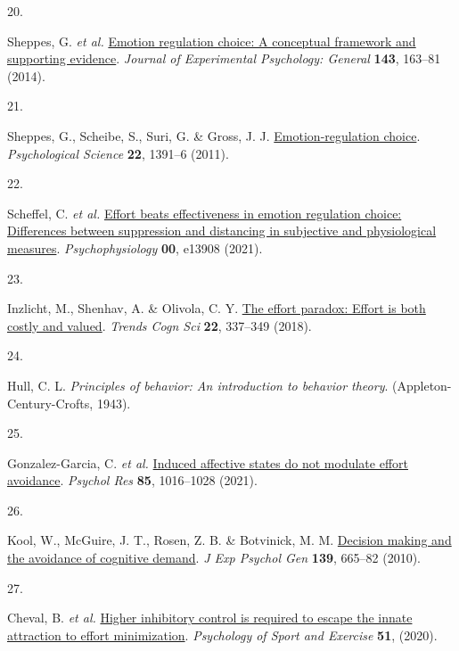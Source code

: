 \documentclass[
  man,floatsintext]{apa6}
\newlength{\cslhangindent}
\newlength{\csllabelwidth}
\newlength{\cslentryspacingunit} %
\newenvironment{CSLReferences}[2] %
 {%
  \setlength{\parindent}{0pt}
  \ifodd #1
  \let\oldpar\par
  \def\par{\hangindent=\cslhangindent\oldpar}
  \fi
  \setlength{\parskip}{#2\cslentryspacingunit}
 }%
 {}
\newcommand{\CSLLeftMargin}[1]{\parbox[t]{\csllabelwidth}{#1}}
\newcommand{\CSLRightInline}[1]{\parbox[t]{\linewidth - \csllabelwidth}{#1}\break}
\begin{document}
\begin{CSLReferences}{0}{0}
\leavevmode{}%
\CSLLeftMargin{20. }%
\CSLRightInline{Sheppes, G. \emph{et al.} \href{https://doi.org/10.1037/a0030831}{Emotion regulation choice: A conceptual framework and supporting evidence}. \emph{Journal of Experimental Psychology: General} \textbf{143}, 163--81 (2014).}

\leavevmode{}%
\CSLLeftMargin{21. }%
\CSLRightInline{Sheppes, G., Scheibe, S., Suri, G. \& Gross, J. J. \href{https://doi.org/10.1177/0956797611418350}{Emotion-regulation choice}. \emph{Psychological Science} \textbf{22}, 1391--6 (2011).}

\leavevmode{}%
\CSLLeftMargin{22. }%
\CSLRightInline{Scheffel, C. \emph{et al.} \href{https://doi.org/10.1111/psyp.13908}{Effort beats effectiveness in emotion regulation choice: Differences between suppression and distancing in subjective and physiological measures}. \emph{Psychophysiology} \textbf{00}, e13908 (2021).}

\leavevmode{}%
\CSLLeftMargin{23. }%
\CSLRightInline{Inzlicht, M., Shenhav, A. \& Olivola, C. Y. \href{https://doi.org/10.1016/j.tics.2018.01.007}{The effort paradox: Effort is both costly and valued}. \emph{Trends Cogn Sci} \textbf{22}, 337--349 (2018).}

\leavevmode{}%
\CSLLeftMargin{24. }%
\CSLRightInline{Hull, C. L. \emph{Principles of behavior: An introduction to behavior theory}. (Appleton-Century-Crofts, 1943).}

\leavevmode{}%
\CSLLeftMargin{25. }%
\CSLRightInline{Gonzalez-Garcia, C. \emph{et al.} \href{https://doi.org/10.1007/s00426-020-01300-9}{Induced affective states do not modulate effort avoidance}. \emph{Psychol Res} \textbf{85}, 1016--1028 (2021).}

\leavevmode{}%
\CSLLeftMargin{26. }%
\CSLRightInline{Kool, W., McGuire, J. T., Rosen, Z. B. \& Botvinick, M. M. \href{https://doi.org/10.1037/a0020198}{Decision making and the avoidance of cognitive demand}. \emph{J Exp Psychol Gen} \textbf{139}, 665--82 (2010).}

\leavevmode{}%
\CSLLeftMargin{27. }%
\CSLRightInline{Cheval, B. \emph{et al.} \href{https://doi.org/ARTN\%20101781\%0A10.1016/j.psychsport.2020.101781}{Higher inhibitory control is required to escape the innate attraction to effort minimization}. \emph{Psychology of Sport and Exercise} \textbf{51}, (2020).}


\end{CSLReferences}
\end{document}

